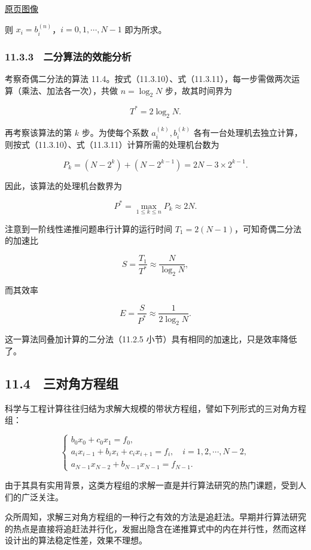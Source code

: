 \documentclass[
  10pt,
  fontset=fandol]{ctexart}
\begin{document}
\href{../../source-images/pdf-288.jpeg}{原页图像}

则 \(x_i=b_i^{(n)}\)，\(i=0,1,\cdots,N-1\) 即为所求。

\subsubsection{11.3.3　二分算法的效能分析}\label{ux4e8cux5206ux7b97ux6cd5ux7684ux6548ux80fdux5206ux6790-1}

考察奇偶二分法的算法 11.4。按式（11.3.10）、式（11.3.11），每一步需做两次运算（乘法、加法各一次），共做 \(n=\log_2 N\) 步，故其时间界为

\[
T^*=2\log_2 N.
\]

再考察该算法的第 \(k\) 步。为使每个系数 \(a_i^{(k)},b_i^{(k)}\) 各有一台处理机去独立计算，则按式（11.3.10）、式（11.3.11）计算所需的处理机台数为

\[
P_k=(N-2^k)+(N-2^{k-1})=2N-3\times2^{k-1}.
\]

因此，该算法的处理机台数界为

\[
P^*=\max_{1\le k\le n}P_k\approx2N.
\]

注意到一阶线性递推问题串行计算的运行时间 \(T_1=2(N-1)\)，可知奇偶二分法的加速比

\[
S=\frac{T_1}{T^*}\approx\frac{N}{\log_2 N},
\]

而其效率

\[
E=\frac{S}{P^*}\approx\frac{1}{2\log_2 N}.
\]

这一算法同叠加计算的二分法（11.2.5 小节）具有相同的加速比，只是效率降低了。

\subsection{11.4　三对角方程组}\label{ux4e09ux5bf9ux89d2ux65b9ux7a0bux7ec4}

科学与工程计算往往归结为求解大规模的带状方程组，譬如下列形式的三对角方程组：

\[
\begin{cases}
b_0x_0+c_0x_1=f_0,\\
a_ix_{i-1}+b_ix_i+c_ix_{i+1}=f_i,\quad i=1,2,\cdots,N-2,\\
a_{N-1}x_{N-2}+b_{N-1}x_{N-1}=f_{N-1}.
\end{cases}
\tag{11.4.1}
\]

由于其具有实用背景，这类方程组的求解一直是并行算法研究的热门课题，受到人们的广泛关注。

众所周知，求解三对角方程组的一种行之有效的方法是追赶法。早期并行算法研究的热点是直接将追赶法并行化，发掘出隐含在递推算式中的内在并行性，然而这样设计出的算法稳定性差，效果不理想。
\end{document}
